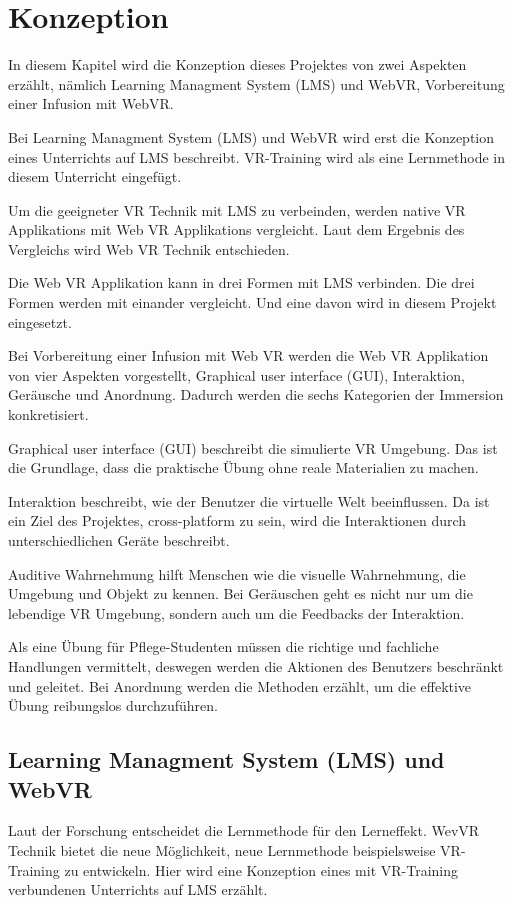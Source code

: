 \chapter{Konzeption}

In diesem Kapitel wird die Konzeption dieses Projektes von zwei Aspekten erzählt, nämlich Learning Managment System (LMS) und WebVR, Vorbereitung einer Infusion mit WebVR.

Bei Learning Managment System (LMS) und WebVR wird erst die Konzeption eines Unterrichts auf LMS beschreibt. VR-Training wird als eine Lernmethode in diesem Unterricht eingefügt.

Um die geeigneter VR Technik mit LMS zu verbeinden, werden native VR Applikations mit Web VR Applikations vergleicht. Laut dem Ergebnis des Vergleichs wird Web VR Technik entschieden.

Die Web VR Applikation kann in drei Formen mit LMS verbinden. Die drei Formen werden mit einander vergleicht. Und eine davon wird in diesem Projekt eingesetzt.

Bei Vorbereitung einer Infusion mit Web VR werden die Web VR Applikation von vier Aspekten vorgestellt, Graphical user interface (GUI), Interaktion, Geräusche und Anordnung. Dadurch werden die sechs Kategorien der Immersion \citep{28} konkretisiert.

Graphical user interface (GUI) beschreibt die simulierte VR Umgebung. Das ist die Grundlage, dass die praktische Übung ohne reale Materialien zu machen.

Interaktion beschreibt, wie der Benutzer die virtuelle Welt beeinflussen. Da ist ein Ziel des Projektes, cross-platform zu sein, wird die Interaktionen durch unterschiedlichen Geräte beschreibt.

Auditive Wahrnehmung hilft Menschen wie die visuelle Wahrnehmung, die Umgebung und Objekt zu kennen. Bei Geräuschen geht es nicht nur um die lebendige VR Umgebung, sondern auch um die Feedbacks der Interaktion.

Als eine Übung für Pflege-Studenten müssen die richtige und fachliche Handlungen vermittelt, deswegen werden die Aktionen des Benutzers beschränkt und geleitet. Bei Anordnung werden die Methoden erzählt, um die effektive Übung reibungslos durchzuführen. 

\section{Learning Managment System (LMS) und WebVR}
Laut der Forschung entscheidet die Lernmethode für den Lerneffekt. WevVR Technik bietet die neue Möglichkeit, neue Lernmethode beispielsweise VR-Training zu entwickeln. Hier wird eine Konzeption eines mit VR-Training verbundenen Unterrichts auf LMS erzählt.


